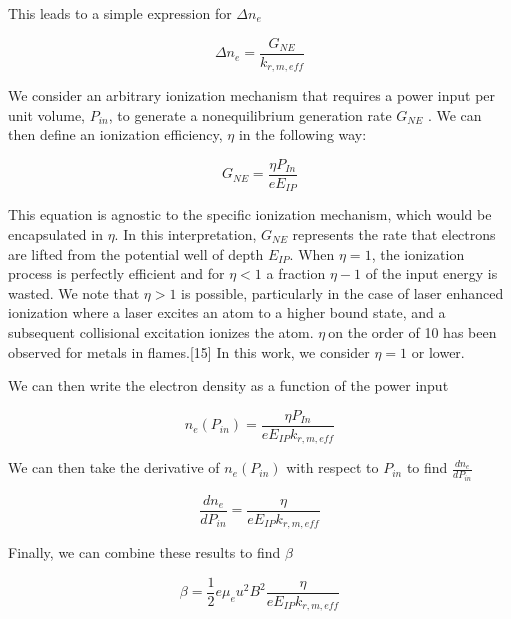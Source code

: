 This leads to a simple expression for $\Delta n_{e}$

\begin{equation}
\Delta n_{e} = \frac{G_{NE}}{k_{r, m, eff}}
\end{equation}


We consider an arbitrary ionization mechanism that requires a power input per unit volume, \(P_{in}\), to generate a nonequilibrium generation rate \(G_{NE}\) . We can then define an ionization efficiency, \(\eta\) in the following way:

\begin{equation}
{G}_{NE} = \frac{\eta P_{In}}{eE_{IP}}
\end{equation}


This equation is agnostic to the specific ionization mechanism, which would be encapsulated in \(\eta\). In this interpretation, \(G_{NE}\) represents the rate that electrons are lifted from the potential well of depth \(E_{IP}\). When \(\eta = 1\), the ionization process is perfectly efficient and for \(\eta < 1\) a fraction \(\eta - 1\) of the input energy is wasted. We note that \(\eta > 1\) is possible, particularly in the case of laser enhanced ionization where a laser excites an atom to a higher bound state, and a subsequent collisional excitation ionizes the atom. \(\eta\ \)on the order of 10 has been observed for metals in flames.{[}15{]} In this work, we consider $\eta =1$ or lower. 

We can then write the electron density as a function of the power input

\begin{equation}
n_{e}(P_{in}) = \frac{\eta P_{In}}{eE_{IP}k_{r, m, eff}}
\end{equation}

We can then take the derivative of $n_{e}(P_{in})$ with respect to $P_{in}$ to find $\frac{dn_{e}}{dP_{in}}$

\begin{equation}
\frac{dn_{e}}{dP_{in}} = \frac{\eta}{eE_{IP}k_{r, m, eff}}
\end{equation}

Finally, we can combine these results to find $\beta$

\begin{equation}
\beta = \frac{1}{2} e \mu_e u^2 B^2 \frac{\eta}{eE_{IP}k_{r, m, eff}}
\end{equation}


